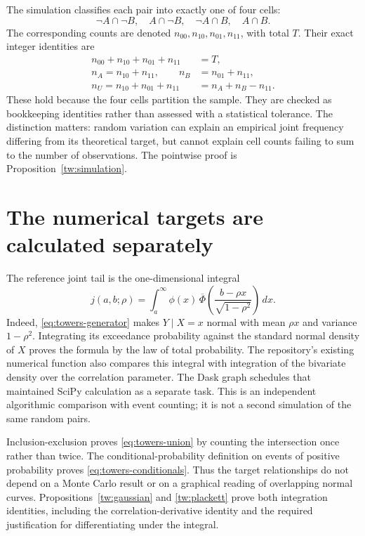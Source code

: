 The simulation classifies each pair into exactly one of four cells:
\[
 \neg A\cap\neg B,\quad A\cap\neg B,\quad
 \neg A\cap B,\quad A\cap B.
\]
The corresponding counts are denoted
\(n_{00},n_{10},n_{01},n_{11}\), with total \(T\). Their exact integer
identities are
\begin{align*}
 n_{00}+n_{10}+n_{01}+n_{11}&=T,\\
 n_A=n_{10}+n_{11},\qquad n_B&=n_{01}+n_{11},\\
 n_U=n_{10}+n_{01}+n_{11}&=n_A+n_B-n_{11}.
\end{align*}
These hold because the four cells partition the sample. They are checked as
bookkeeping identities rather than assessed with a statistical tolerance.
The distinction matters: random variation can explain an empirical joint
frequency differing from its theoretical target, but cannot explain cell
counts failing to sum to the number of observations.
The pointwise proof is Proposition~\ref{tw:simulation}.

\section{The numerical targets are calculated separately}

The reference joint tail is the one-dimensional integral
\begin{equation}
 j(a,b;\rho)=\int_a^\infty
 \phi(x)\,\overline\Phi\!\left(
 \frac{b-\rho x}{\sqrt{1-\rho^2}}\right)\,dx.
 \label{eq:towers-reference-integral}
\end{equation}
Indeed, \eqref{eq:towers-generator} makes \(Y\mid X=x\) normal with mean
\(\rho x\) and variance \(1-\rho^2\). Integrating its exceedance probability
against the standard normal density of \(X\) proves the formula by the law of
total probability. The repository's existing numerical function also compares
this integral with integration of the bivariate density over the correlation
parameter. The Dask graph schedules that maintained SciPy calculation as a
separate task. This is an independent algorithmic comparison with event
counting; it is not a second simulation of the same random pairs.

Inclusion-exclusion proves \eqref{eq:towers-union} by counting the intersection
once rather than twice. The conditional-probability definition on events of
positive probability proves \eqref{eq:towers-conditionals}. Thus the target
relationships do not depend on a Monte Carlo result or on a graphical reading
of overlapping normal curves.
Propositions~\ref{tw:gaussian} and \ref{tw:plackett} prove both integration
identities, including the correlation-derivative identity and the required
justification for differentiating under the integral.

